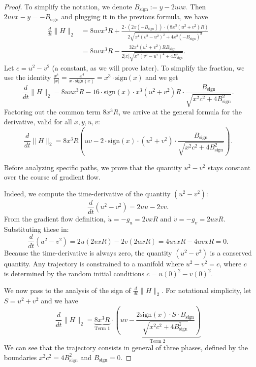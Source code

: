 \documentclass[a4paper,11pt]{article}
\newcommand{\1}{\mathbbm{1}}
\theoremstyle{plain}
\begin{document}
\begin{proof}
To simplify the notation, we denote $B_{\text{sign}} := y - 2uvx$.
Then $2uvx - y = -B_{\text{sign}}$ and plugging it in the previous formula, we have
\begin{align*}
    \frac{d}{dt} \|H\|_2 &= 8uvx^3 R + \frac{2 \cdot (2x(-B_{\text{sign}})) \cdot (8x^3(u^2+v^2)R)}{2\sqrt{x^4(v^2-u^2)^2 + 4x^2(-B_{\text{sign}})^2}} \\
    &= 8uvx^3 R - \frac{32 x^4 (u^2+v^2) R B_{\text{sign}}}{2|x|\sqrt{x^2(v^2-u^2)^2 + 4B_{\text{sign}}^2}}.
\end{align*}
Let $c = u^2 - v^2$ (a constant, as we will prove later).
To simplify the fraction, we use the identity $\frac{x^4}{|x|} = \frac{x^4}{x \cdot \text{sign}(x)} = x^3 \cdot \text{sign}(x)$ and we get
$$
\frac{d}{dt} \|H\|_2 = 8uvx^3 R - 16 \cdot \text{sign}(x) \cdot x^3 (u^2+v^2) R \cdot \frac{B_{\text{sign}}}{\sqrt{x^2c^2 + 4B_{\text{sign}}^2}}.
$$
Factoring out the common term $8x^3 R$, we arrive at the general formula for the derivative, valid for all $x,y,u,v$:
\begin{equation} \label{eq:deriv_general}
    \frac{d}{dt} \|H\|_2 = 8x^3 R \left( uv - 2 \cdot \text{sign}(x) \cdot (u^2+v^2) \cdot \frac{B_{\text{sign}}}{\sqrt{x^2c^2 + 4B_{\text{sign}}^2}} \right).
\end{equation}


Before analyzing specific paths, we prove that the quantity $u^2 - v^2$ stays constant over the course of gradient flow.

Indeed, we compute the time-derivative of the quantity $(u^2 - v^2)$:
$$
\frac{d}{dt}(u^2 - v^2) = 2u \dot{u} - 2v \dot{v}.
$$
From the gradient flow definition, $\dot{u} = -g_u = 2vxR$ and $\dot{v} = -g_v = 2uxR$.
Substituting these in:
$$
\frac{d}{dt}(u^2 - v^2) = 2u(2vxR) - 2v(2uxR) = 4uvxR - 4uvxR = 0.
$$
Because the time-derivative is always zero, the quantity $(u^2 - v^2)$ is a conserved quantity. Any trajectory is constrained to a manifold where $u^2 - v^2 = c$, where $c$ is determined by the random initial conditions $c = u(0)^2 - v(0)^2$.



We now pass to the analysis of the sign of $\frac{d}{dt} \|H\|_2$. For notational simplicity, let $S = u^2+v^2$ and we have
$$
\frac{d}{dt} \|H\|_2 = \underbrace{8x^3 R}_{\text{Term 1}} \cdot \underbrace{\left( uv - \frac{2 \text{sign}(x) \cdot S \cdot B_{\text{sign}}}{\sqrt{x^2c^2 + 4B_{\text{sign}}^2}} \right)}_{\text{Term 2}}
$$
We can see that the trajectory consists in general of three phases, defined by the boundaries $x^2c^2 = 4B_{\text{sign}}^2$ and $B_{\text{sign}} = 0$.


\end{proof}
\end{document}
